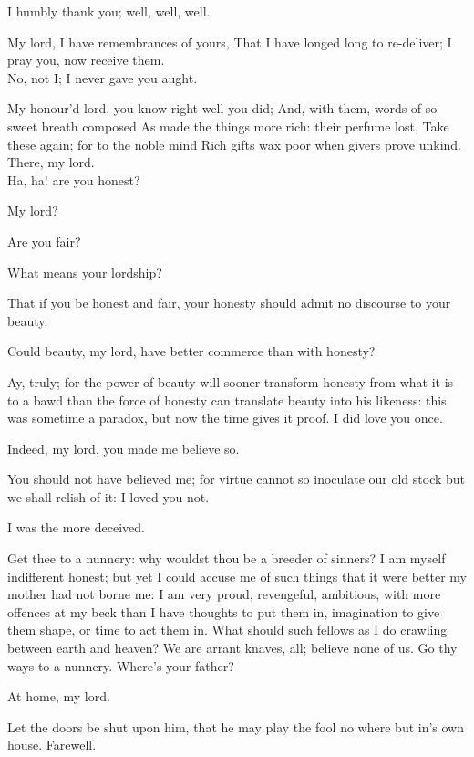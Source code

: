 \documentclass[11pt]{book}
\begin{document}
\1	I humbly thank you; well, well, well.

\4	My lord, I have remembrances of yours,
	That I have longed long to re-deliver;
	I pray you, now receive them. \\

\1	No, not I;
	I never gave you aught.

\4	My honour'd lord, you know right well you did;
	And, with them, words of so sweet breath composed
	As made the things more rich: their perfume lost,
	Take these again; for to the noble mind
	Rich gifts wax poor when givers prove unkind.
	There, my lord. \\

\1	Ha, ha! are you honest?

\Prosa

\4	My lord?

\1	Are you fair?

\4	What means your lordship?

\1	That if you be honest and fair, your honesty should
	admit no discourse to your beauty.

\4	Could beauty, my lord, have better commerce than
	with honesty?

\1	Ay, truly; for the power of beauty will sooner
	transform honesty from what it is to a bawd than the
	force of honesty can translate beauty into his
	likeness: this was sometime a paradox, but now the
	time gives it proof. I did love you once.

\4	Indeed, my lord, you made me believe so.

\1	You should not have believed me; for virtue cannot
	so inoculate our old stock but we shall relish of
	it: I loved you not.

\4	I was the more deceived.

\1	Get thee to a nunnery: why wouldst thou be a
	breeder of sinners? I am myself indifferent honest;
	but yet I could accuse me of such things that it
	were better my mother had not borne me: I am very
	proud, revengeful, ambitious, with more offences at
	my beck than I have thoughts to put them in,
	imagination to give them shape, or time to act them
	in. What should such fellows as I do crawling
	between earth and heaven? We are arrant knaves,
	all; believe none of us. Go thy ways to a nunnery.
	Where's your father?

\4	At home, my lord.

\1	Let the doors be shut upon him, that he may play the
	fool no where but in's own house. Farewell.
\end{document}
